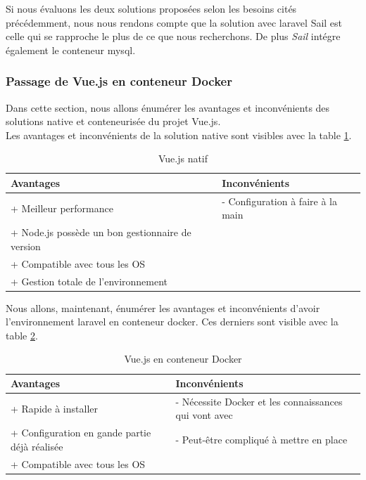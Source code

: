 \documentclass[
    iai, %
    il, %
]{heig-tb}
\begin{document}
Si nous évaluons les deux solutions proposées selon les besoins cités précédemment, nous nous rendons compte que la solution avec \Gls{laravel} Sail est celle qui se rapproche le plus de ce que nous recherchons. De plus \emph{Sail} intégre également le \Gls{conteneur} \Gls{mysql}.

\subsubsection{Passage de Vue.js en conteneur Docker}
Dans cette section, nous allons énumérer les avantages et inconvénients des solutions native et conteneurisée du projet Vue.js. \\
Les avantages et inconvénients de la solution native sont visibles avec la table \ref{dev-vuejs-native}.

\begin{table}[h]
    \begin{center}
        \caption{Vue.js natif \label{dev-vuejs-native}}
        \begin{tabular}{X|X}
            Avantages                                        & Inconvénients                     \\ \hline
            + Meilleur performance                           & - Configuration à faire à la main \\
            + Node.js possède un bon gestionnaire de version &                                   \\
            + Compatible avec tous les OS                    &                                   \\
            + Gestion totale de l'environnement              &                                   \\
        \end{tabular}
    \end{center}
\end{table}

Nous allons, maintenant, énumérer les avantages et inconvénients d'avoir l'environnement \Gls{laravel} en
\Gls{conteneur} \Gls{docker}. Ces derniers sont visible avec la table \ref{dev-vuejs-docker}.

\begin{table}[h]
    \begin{center}
        \caption{Vue.js en conteneur Docker \label{dev-vuejs-docker}}
        \begin{tabular}{X|X}
            Avantages                                     & Inconvénients                                         \\ \hline
            + Rapide à installer                          & - Nécessite Docker et les connaissances qui vont avec \\
            + Configuration en gande partie déjà réalisée & - Peut-être compliqué à mettre en place               \\
            + Compatible avec tous les OS                 &                                                       \\
        \end{tabular}
    \end{center}
\end{table}
\end{document}
